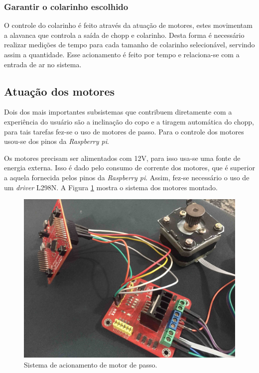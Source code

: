 \subsubsection{Garantir o colarinho escolhido}
O controle do colarinho é feito através da atuação de motores, estes  movimentam
a alavanca que controla a saída de chopp e colarinho. Desta forma é necessário realizar 
medições de tempo para cada tamanho de colarinho selecionável, servindo assim a quantidade. 
Esse acionamento é feito por tempo e relaciona-se com a entrada de ar no  sistema.


\subsection{Atuação dos motores}
Dois dos mais importantes subsistemas que contribuem diretamente com a experiência do usuário são 
a inclinação do copo e a tiragem automática do chopp, para tais tarefas fez-se o uso de motores de passo.
Para o controle dos motores usou-se dos pinos da \textit{Raspberry pi}.

Os motores precisam ser alimentados com 12V, para isso usa-se uma fonte de energia externa. Isso é dado pelo
 consumo de corrente dos motores, que é superior a aquela fornecida pelos pinos da \textit{Raspberry pi}. Assim,
fez-se necessário o uso de um \textit{driver} L298N. A Figura \ref{motor} mostra o sistema dos motores montado.

\begin{figure}[!h]
            \centering
         	\includegraphics[scale= 0.08]{figuras/motor.jpg}
            \caption{Sistema de acionamento de motor de passo.}
            \label{motor}
\end{figure}

